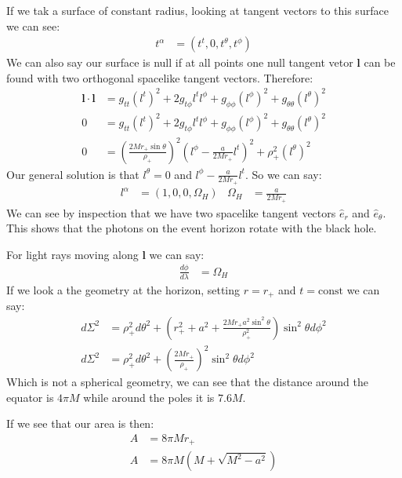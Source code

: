 If we tak  a surface of constant radius, looking at tangent vectors to this surface we can see:
\begin{align*}
	t^\alpha &= (t^t,0,t^\theta,t^\phi)
\end{align*}
We can also say our surface is null if at all points one null tangent vetor $\bm{l}$ can be found with two orthogonal spacelike tangent vectors. Therefore:
\begin{align*}
	\bm{l}\cdot\bm{l} &= g_{tt} (l^t)^2 + 2 g_{t\phi} l^tl^\phi + g_{\phi\phi} (l^\phi)^2 + g_{\theta\theta} (l^\theta)^2\\
	0 &= g_{tt} (l^t)^2 + 2 g_{t\phi} l^tl^\phi + g_{\phi\phi} (l^\phi)^2  + g_{\theta\theta} (l^\theta)^2\\
	0 &= \left(\frac{2Mr_+\sin\theta}{\rho_+}\right)^2 \left(l^\phi - \frac{a}{2Mr_+} l^t\right)^2 + \rho_+^2(l^\theta)^2
\end{align*}
Our general solution is that $l^\theta = 0$ and $l^\phi - \frac{a}{2Mr_+} l^t$. So we can say:
\begin{align*}
	l^\alpha &= (1,0,0,\Omega_H) & \Omega_H &= \frac{a}{2Mr_+}
\end{align*}
We can see by inspection that we have two spacelike tangent vectors $\hat{e}_r$ and $\hat{e}_\theta$. This shows that the photons on the event horizon rotate with the black hole.

For light rays moving along $\bm{l}$ we can say:
\begin{align*}
	\frac{d\phi}{d\lambda} &= \Omega_H
\end{align*}
If we look a the geometry at the horizon, setting $r=r_+$ and $t=\text{const}$ we can say:
\begin{align*}
	d\Sigma^2 &= \rho_+^2d\theta^2 + \left( r_+^2 + a^2 + \frac{2Mr_+ a^2\sin^2\theta}{\rho_+^2}\right)\sin^2\theta d\phi^2 \\
	d\Sigma^2 &= \rho_+^2d\theta^2 + \left(\frac{2Mr_+}{\rho_+}\right)^2\sin^2\theta d\phi^2 
\end{align*}
Which is not a spherical geometry, we can see that the distance around the equator is $4\pi M$ while around the poles it is $7.6 M$.

If we see that our area is then:
\begin{align*}
	A &= 8\pi M r_+ \\
	A &= 8\pi M (M + \sqrt{M^2 -a^2})
\end{align*}
